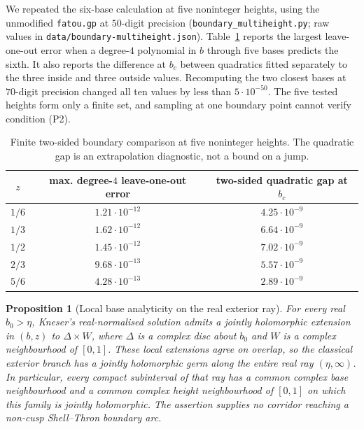 \documentclass[11pt,a4paper]{article}
\newtheorem{proposition}[theorem]{Proposition}
\theoremstyle{definition}
\begin{document}
We repeated the six-base calculation at five noninteger heights, using the
unmodified \texttt{fatou.gp} at $50$-digit precision
(\nolinkurl{boundary_multiheight.py}; raw values in
\nolinkurl{data/boundary-multiheight.json}).  Table~\ref{tab:bnd-multiheight}
reports the largest leave-one-out error when a degree-$4$ polynomial in $b$
through five bases predicts the sixth.  It also reports the difference at
$b_c$ between quadratics fitted separately to the three inside and three
outside values.  Recomputing the two closest bases at $70$-digit precision
changed all ten values by less than $5\cdot10^{-50}$.
The five tested heights form only a finite set, and sampling at one
boundary point cannot verify condition (P2).

\begin{table}[htbp]
\centering
\caption{Finite two-sided boundary comparison at five noninteger heights.
The quadratic gap is an extrapolation diagnostic, not a bound on a jump.}
\label{tab:bnd-multiheight}
\begin{tabular}{ccc}
\toprule
$z$ & max. degree-$4$ leave-one-out error & two-sided quadratic gap at $b_c$\\
\midrule
$1/6$ & $1.21\cdot10^{-12}$ & $4.25\cdot10^{-9}$\\
$1/3$ & $1.62\cdot10^{-12}$ & $6.64\cdot10^{-9}$\\
$1/2$ & $1.45\cdot10^{-12}$ & $7.02\cdot10^{-9}$\\
$2/3$ & $9.68\cdot10^{-13}$ & $5.57\cdot10^{-9}$\\
$5/6$ & $4.28\cdot10^{-13}$ & $2.89\cdot10^{-9}$\\
\bottomrule
\end{tabular}
\end{table}

\begin{proposition}[Local base analyticity on the real exterior ray]
\label{prop:exterior-real-parameter}
For every real $b_0>\eta$, Kneser's real-normalised solution admits a
jointly holomorphic extension in $(b,z)$ to $\Delta\times W$, where
$\Delta$ is a complex disc about $b_0$ and $W$ is a complex
neighbourhood of $[0,1]$.  These local extensions agree on overlap,
so the classical exterior branch has a jointly holomorphic germ along
the entire real ray $(\eta,\infty)$.  In particular, every compact
subinterval of that ray has a common complex base neighbourhood and a
common complex height neighbourhood of $[0,1]$ on which this family is
jointly holomorphic.  The assertion supplies no
corridor reaching a non-cusp Shell--Thron boundary arc.
\end{proposition}
\end{document}
